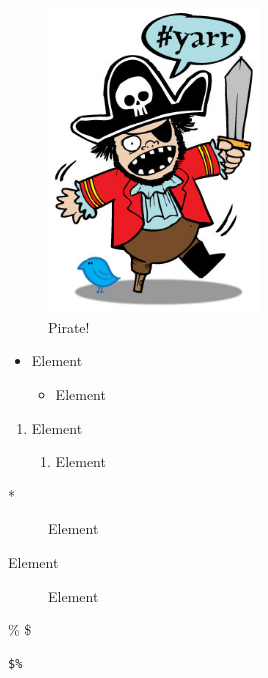 \documentclass[a4paper, 20pt]{extarticle}
\begin{document}
\newpage

\begin{figure}
\centering
\includegraphics[width=0.5\textwidth]{img/pirate.jpg}
\caption{Pirate!}
\label{fig:pirate}
\end{figure}


\begin{itemize}
\item
Element
	\begin{itemize}
	\item
	Element
	\end{itemize}
\end{itemize}


\begin{enumerate}
\item
Element
	\begin{enumerate}
	\item
	Element
	\end{enumerate}
\end{enumerate}
\newpage
\begin{description}
\item[*] Element
\item[Element] Element
\end{description}

\% \$

\begin{verbatim}
$%
\end{verbatim}


\newpage





\end{document}
